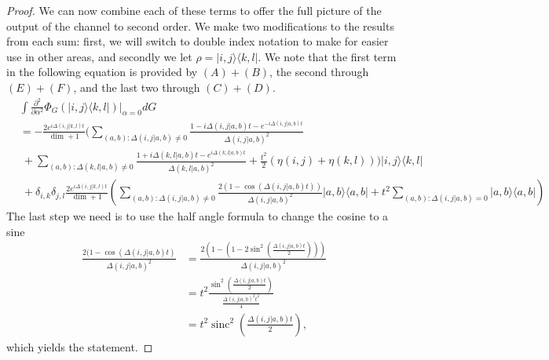 \documentclass[
 amsmath,amssymb,
 aps,
onecolumn, 
nofootinbib]{revtex4-2}
\newcommand{\ketbra}[2]{| #1\rangle\! \langle #2|}
\newcommand{\parens}[1]{\left( #1 \right)}
\DeclareMathOperator{\sinc}{sinc}
\begin{document}
\begin{proof}
 We can now combine each of these terms to offer the full picture of the output of the channel to second order. We make two modifications to the results from each sum: first, we will switch to double index notation to make for easier use in other areas, and secondly we let $\rho = \ketbra{i,j}{k,l}$. We note that the first term in the following equation is provided by $(A) + (B)$, the second through $(E) + (F)$, and the last two through $(C) + (D)$. 
 \begin{align}
     &\int \frac{\partial^2}{\partial \alpha^2} \Phi_G(\ketbra{i,j}{k,l})\bigg|_{\alpha = 0} dG \\
     &= -\frac{2  e^{i \Delta(i,j|k,l) t}}{\dim + 1} \bigg(\sum_{(a,b): \Delta(i,j|a,b) \neq 0} \frac{1 - i \Delta(i,j|a,b)t - e^{-i \Delta(i,j|a,b) t}}{\Delta(i,j|a,b)^2} \nonumber \\
     &~+ \sum_{(a,b): \Delta(k,l|a,b) \neq 0} \frac{1 + i \Delta(k,l|a,b) t - e^{i \Delta(k,l|a,b) t}}{\Delta(k,l|a,b)^2} + \frac{t^2}{2}(\eta(i,j) + \eta(k,l)) \bigg) \ketbra{i,j}{k,l} \nonumber \\
    &~ +\delta_{i,k} \delta_{j,l} \frac{2 e^{i \Delta(i,j|k,l)t}}{\dim+1} \parens{ \sum_{(a,b): \Delta(i,j|a,b) \neq 0 } \frac{2(1- \cos (\Delta(i,j|a,b)t))}{\Delta(i,j|a,b)^2} \ketbra{a,b}{a,b} + t^2 \sum_{(a,b) : \Delta(i,j|a,b) = 0} \ketbra{a,b}{a,b}} \label{eq:second_order_output}
 \end{align}
The last step we need is to use the half angle formula to change the cosine to a sine
\begin{align}
    \frac{2(1 - \cos(\Delta(i,j| a,b)t)}{\Delta(i,j|a,b)^2} &= \frac{2\left( 1 - \left(1 - 2 \sin^2\left(\frac{\Delta(i,j|a,b)t}{2} \right) \right) \right)}{\Delta(i,j|a,b)^2} \label{eq:trig_start} \\
    &= t^2 \frac{\sin^2 \left(\frac{\Delta(i,j|a,b) t}{2} \right)}{\frac{\Delta(i,j|a,b)^2 t^2}{4}} \\
    &= t^2 \sinc^2 \left(\frac{\Delta(i,j|a,b) t}{2 } \right), \label{eq:trig_end}
\end{align}
which yields the statement.



\end{proof}
\end{document}
